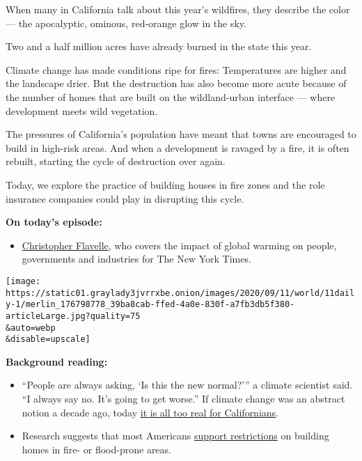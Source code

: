 When many in California talk about this year's wildfires, they describe
the color --- the apocalyptic, ominous, red-orange glow in the sky.

Two and a half million acres have already burned in the state this year.

Climate change has made conditions ripe for fires: Temperatures are
higher and the landscape drier. But the destruction has also become more
acute because of the number of homes that are built on the
wildland-urban interface --- where development meets wild vegetation.

The pressures of California's population have meant that towns are
encouraged to build in high-risk areas. And when a development is
ravaged by a fire, it is often rebuilt, starting the cycle of
destruction over again.

Today, we explore the practice of building houses in fire zones and the
role insurance companies could play in disrupting this cycle.

\textbf{On today's episode:}

\begin{itemize}
\tightlist
\item
  \href{https://www.nytimes3xbfgragh.onion/by/christopher-flavelle}{Christopher
  Flavelle}, who covers the impact of global warming on people,
  governments and industries for The New York Times.
\end{itemize}

\texttt{[image: https://static01.graylady3jvrrxbe.onion/images/2020/09/11/world/11daily-1/merlin\_176798778\_39ba8cab-ffed-4a0e-830f-a7fb3db5f380-articleLarge.jpg?quality=75\\\&auto=webp\\\&disable=upscale]}

\textbf{Background reading:}

\begin{itemize}
\item
  ``People are always asking, `Is this the new normal?''' a climate
  scientist said. ``I always say no. It's going to get worse.'' If
  climate change was an abstract notion a decade ago, today
  \href{https://www.nytimes3xbfgragh.onion/2020/09/10/us/climate-change-california-wildfires.html?action=click\&module=Top\%20Stories\&pgtype=Homepage}{it
  is all too real for Californians}.
\item
  Research suggests that most Americans
  \href{https://www.nytimes3xbfgragh.onion/2020/09/04/climate/flood-fire-building-restrictions.html}{support
  restrictions} on building homes in fire- or flood-prone areas.
\end{itemize}

